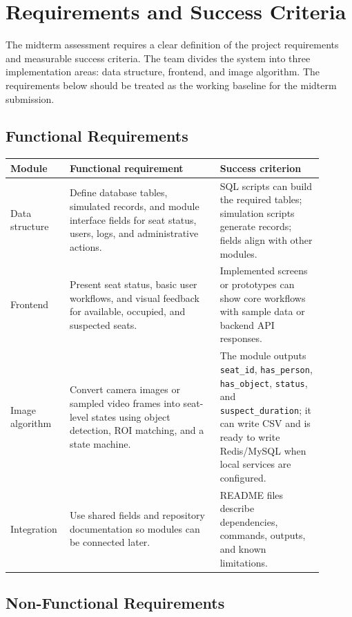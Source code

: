 \section{Requirements and Success Criteria}

The midterm assessment requires a clear definition of the project requirements and measurable success criteria. The team divides the system into three implementation areas: data structure, frontend, and image algorithm. The requirements below should be treated as the working baseline for the midterm submission.

\subsection{Functional Requirements}

\begin{longtable}{|p{0.14\linewidth}|p{0.45\linewidth}|p{0.31\linewidth}|}
\hline
\textbf{Module} & \textbf{Functional requirement} & \textbf{Success criterion} \\
\hline
Data structure & Define database tables, simulated records, and module interface fields for seat status, users, logs, and administrative actions. & SQL scripts can build the required tables; simulation scripts generate records; fields align with other modules. \\
\hline
Frontend & Present seat status, basic user workflows, and visual feedback for available, occupied, and suspected seats. & Implemented screens or prototypes can show core workflows with sample data or backend API responses. \\
\hline
Image algorithm & Convert camera images or sampled video frames into seat-level states using object detection, ROI matching, and a state machine. & The module outputs \texttt{seat\_id}, \texttt{has\_person}, \texttt{has\_object}, \texttt{status}, and \texttt{suspect\_duration}; it can write CSV and is ready to write Redis/MySQL when local services are configured. \\
\hline
Integration & Use shared fields and repository documentation so modules can be connected later. & README files describe dependencies, commands, outputs, and known limitations. \\
\hline
\end{longtable}

\subsection{Non-Functional Requirements}

